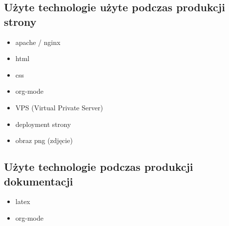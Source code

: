 \documentclass[11pt]{article}
\begin{document}
\subsection{Użyte technologie użyte podczas produkcji strony}
\label{sec:org8f9f1c5}
\begin{itemize}
\item apache / nginx
\item html
\item css
\item org-mode
\item VPS (Virtual Private Server)
\item deployment strony
\item obraz png (zdjęcie)
\end{itemize}
\subsection{Użyte technologie podczas produkcji dokumentacji}
\label{sec:org7cb9d0b}
\begin{itemize}
\item latex
\item org-mode
\end{itemize}
\end{document}
